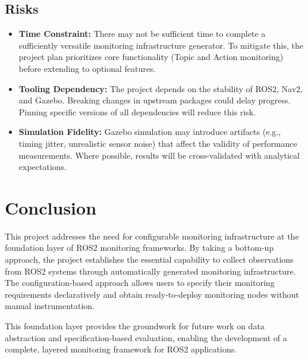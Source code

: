 \subsection{Risks}
\begin{itemize}[leftmargin=*]
    \item \textbf{Time Constraint:} There may not be sufficient time to complete a sufficiently versatile monitoring infrastructure generator. To mitigate this, the project plan prioritizes core functionality (Topic and Action monitoring) before extending to optional features.
    \item \textbf{Tooling Dependency:} The project depends on the stability of ROS2, Nav2, and Gazebo. Breaking changes in upstream packages could delay progress. Pinning specific versions of all dependencies will reduce this risk.
    \item \textbf{Simulation Fidelity:} Gazebo simulation may introduce artifacts (e.g., timing jitter, unrealistic sensor noise) that affect the validity of performance measurements. Where possible, results will be cross-validated with analytical expectations.
\end{itemize}

\section{Conclusion}

This project addresses the need for configurable monitoring infrastructure at the foundation layer of ROS2 monitoring frameworks. By taking a bottom-up approach, the project establishes the essential capability to collect observations from ROS2 systems through automatically generated monitoring infrastructure. The configuration-based approach allows users to specify their monitoring requirements declaratively and obtain ready-to-deploy monitoring nodes without manual instrumentation.

This foundation layer provides the groundwork for future work on data abstraction and specification-based evaluation, enabling the development of a complete, layered monitoring framework for ROS2 applications.

\newpage




